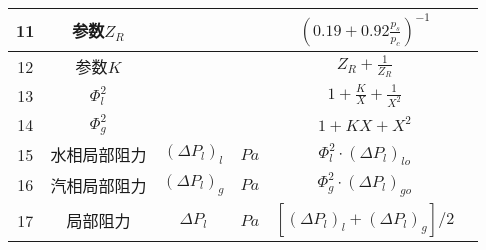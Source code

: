 \begin{table}[H]
{\begin{tabular}{|c|c|c|c|c|c|}
            11   & 参数$ Z_R $                  &                       &            & $ (0.19+0.92 \frac{p_s}{p_c})^{-1} $                                     &      \\ \hline
            12   & 参数$ K $                    &                       &            & $ Z_R + \frac{1}{Z_R} $                                                  &      \\ \hline
            13   & $ \Phi_{l}^{2} $             &                       &            & $ 1 + \frac{K}{X} + \frac{1}{X^{2}} $                                    &      \\ \hline
            14   & $ \Phi_{g}^{2} $             &                       &            & $ 1+KX + X^{2} $                                                         &      \\ \hline
            15   & 水相局部阻力                 & $ (\Delta P_l)_{l} $  & $ Pa $     & $ \Phi_{l}^{2} \cdot (\Delta P_l)_{lo} $                                 &      \\ \hline
            16   & 汽相局部阻力                 & $ (\Delta P_l)_{g} $  & $ Pa $     & $ \Phi_{g}^{2} \cdot (\Delta P_l)_{go} $                                 &      \\ \hline
            17   & 局部阻力                     & $ \Delta P_l $        & $ Pa $     & $ [ (\Delta P_l)_{l} + (\Delta P_l)_{g} ] / 2 $                          &      \\ \hline
        \end{tabular}
    }
\end{table}

